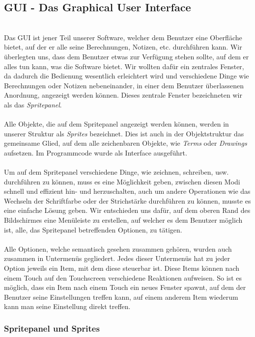 \subsection{GUI - Das Graphical User Interface}\ \\
Das GUI ist jener Teil unserer Software, welcher dem Benutzer eine Oberfläche bietet, auf der er alle seine Berechnungen, Notizen, etc. durchführen kann. Wir überlegten uns, dass dem Benutzer etwas zur Verfügung stehen sollte, auf dem er alles tun kann, was die Software bietet. Wir wollten dafür ein zentrales Fenster, da dadurch die Bedienung wesentlich erleichtert wird und verschiedene Dinge wie Berechnungen oder Notizen nebeneinander, in einer dem Benutzer überlassenen Anordnung, angezeigt werden können. Dieses zentrale Fenster bezeichneten wir als das \textit{Spritepanel}.\\
\\
Alle Objekte, die auf dem Spritepanel angezeigt werden können, werden in unserer Struktur als \textit{Sprites} bezeichnet. Dies ist auch in der Objektstruktur das gemeinsame Glied, auf dem alle zeichenbaren Objekte, wie \textit{Terms} oder \textit{Drawings} aufsetzen. Im Programmcode wurde  als Interface ausgeführt.\\
\\
Um auf dem Spritepanel verschiedene Dinge, wie zeichnen, schreiben, usw. durchführen zu können, muss es eine Möglichkeit geben, zwischen diesen Modi schnell und effizient hin- und herzuschalten, auch um andere Operationen wie das Wechseln der Schriftfarbe oder der Strichstärke durchführen zu können, musste es eine einfache Lösung geben. Wir entschieden uns dafür, auf dem oberen Rand des Bildschirmes eine Menüleiste zu erstellen, auf welcher es dem Benutzer möglich ist, alle, das Spritepanel betreffenden Optionen, zu tätigen.\\
\\
Alle Optionen, welche semantisch gesehen zusammen gehören, wurden auch zusammen in Untermenüs gegliedert. Jedes dieser Untermenüs hat zu jeder Option jeweils ein Item, mit dem diese steuerbar ist. Diese Items können nach einem Touch auf den Touchscreen verschiedene Reaktionen aufweisen. So ist es möglich, dass ein Item nach einem Touch ein neues Fenster spawnt, auf dem der Benutzer seine Einstellungen treffen kann, auf einem anderem Item wiederum kann man seine Einstellung direkt treffen.\\

\subsubsection{Spritepanel und Sprites}

